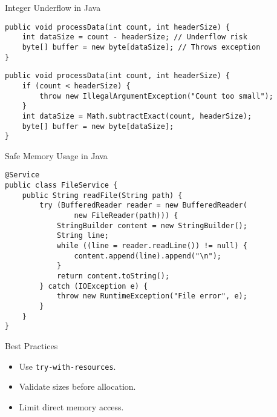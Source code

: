 \documentclass[12pt]{beamer}
\begin{document}
\begin{frame}[fragile]{Integer Underflow in Java}
  \begin{lstlisting}[style=javastyle]
public void processData(int count, int headerSize) {
    int dataSize = count - headerSize; // Underflow risk
    byte[] buffer = new byte[dataSize]; // Throws exception
}
  \end{lstlisting}
  \begin{lstlisting}[style=javastyle]
public void processData(int count, int headerSize) {
    if (count < headerSize) {
        throw new IllegalArgumentException("Count too small");
    }
    int dataSize = Math.subtractExact(count, headerSize);
    byte[] buffer = new byte[dataSize];
}
  \end{lstlisting}
\end{frame}

\begin{frame}[fragile]{Safe Memory Usage in Java}
  \begin{lstlisting}[style=javastyle]
@Service
public class FileService {
    public String readFile(String path) {
        try (BufferedReader reader = new BufferedReader(
                new FileReader(path))) {
            StringBuilder content = new StringBuilder();
            String line;
            while ((line = reader.readLine()) != null) {
                content.append(line).append("\n");
            }
            return content.toString();
        } catch (IOException e) {
            throw new RuntimeException("File error", e);
        }
    }
}
  \end{lstlisting}
  \begin{block}{Best Practices}
    \begin{itemize}
      \item Use \texttt{try-with-resources}.
      \item Validate sizes before allocation.
      \item Limit direct memory access.
    \end{itemize}
  \end{block}
\end{frame}
\end{document}
